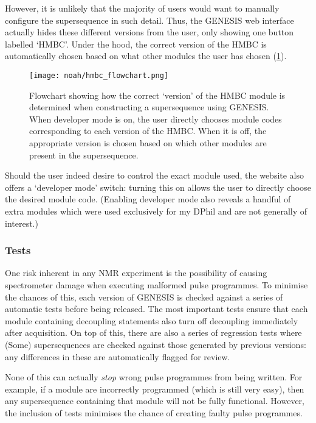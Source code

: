 However, it is unlikely that the majority of users would want to manually configure the supersequence in such detail.
Thus, the GENESIS web interface actually hides these different versions from the user, only showing one button labelled `HMBC'.
Under the hood, the correct version of the HMBC is automatically chosen based on what other modules the user has chosen (\cref{fig:hmbc_flowchart}).

\begin{figure}[htb]
    \centering
    \texttt{[image: noah/hmbc\_flowchart.png]}%
    \caption[Flowchart for choosing HMBC module version]{
        Flowchart showing how the correct `version' of the HMBC module is determined when constructing a supersequence using GENESIS.
        When developer mode is on, the user directly chooses module codes corresponding to each version of the HMBC.
        When it is off, the appropriate version is chosen based on which other modules are present in the supersequence.
    }
    \label{fig:hmbc_flowchart}
\end{figure}

Should the user indeed desire to control the exact module used, the website also offers a `developer mode' switch: turning this on allows the user to directly choose the desired module code.
(Enabling developer mode also reveals a handful of extra modules which were used exclusively for my DPhil and are not generally of interest.)


\subsubsection{Tests}

One risk inherent in any NMR experiment is the possibility of causing spectrometer damage when executing malformed pulse programmes.
To minimise the chances of this, each version of GENESIS is checked against a series of automatic tests before being released.
The most important tests ensure that each module containing decoupling statements also turn off decoupling immediately after acquisition.
On top of this, there are also a series of regression tests where (Some) supersequences are checked against those generated by previous versions: any differences in these are automatically flagged for review.

None of this can actually \textit{stop} wrong pulse programmes from being written.
For example, if a module are incorrectly programmed (which is still very easy), then any supersequence containing that module will not be fully functional.
However, the inclusion of tests minimises the chance of creating faulty pulse programmes.

